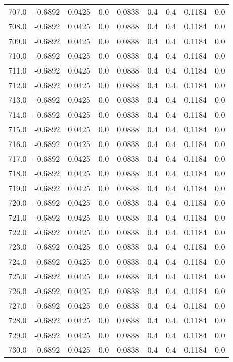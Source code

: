 \begin{longtable}{lrrrrrrrr}
707.0 & -0.6892 & 0.0425 & 0.0 & 0.0838 & 0.4 & 0.4 & 0.1184 & 0.0 \\
708.0 & -0.6892 & 0.0425 & 0.0 & 0.0838 & 0.4 & 0.4 & 0.1184 & 0.0 \\
709.0 & -0.6892 & 0.0425 & 0.0 & 0.0838 & 0.4 & 0.4 & 0.1184 & 0.0 \\
710.0 & -0.6892 & 0.0425 & 0.0 & 0.0838 & 0.4 & 0.4 & 0.1184 & 0.0 \\
711.0 & -0.6892 & 0.0425 & 0.0 & 0.0838 & 0.4 & 0.4 & 0.1184 & 0.0 \\
712.0 & -0.6892 & 0.0425 & 0.0 & 0.0838 & 0.4 & 0.4 & 0.1184 & 0.0 \\
713.0 & -0.6892 & 0.0425 & 0.0 & 0.0838 & 0.4 & 0.4 & 0.1184 & 0.0 \\
714.0 & -0.6892 & 0.0425 & 0.0 & 0.0838 & 0.4 & 0.4 & 0.1184 & 0.0 \\
715.0 & -0.6892 & 0.0425 & 0.0 & 0.0838 & 0.4 & 0.4 & 0.1184 & 0.0 \\
716.0 & -0.6892 & 0.0425 & 0.0 & 0.0838 & 0.4 & 0.4 & 0.1184 & 0.0 \\
717.0 & -0.6892 & 0.0425 & 0.0 & 0.0838 & 0.4 & 0.4 & 0.1184 & 0.0 \\
718.0 & -0.6892 & 0.0425 & 0.0 & 0.0838 & 0.4 & 0.4 & 0.1184 & 0.0 \\
719.0 & -0.6892 & 0.0425 & 0.0 & 0.0838 & 0.4 & 0.4 & 0.1184 & 0.0 \\
720.0 & -0.6892 & 0.0425 & 0.0 & 0.0838 & 0.4 & 0.4 & 0.1184 & 0.0 \\
721.0 & -0.6892 & 0.0425 & 0.0 & 0.0838 & 0.4 & 0.4 & 0.1184 & 0.0 \\
722.0 & -0.6892 & 0.0425 & 0.0 & 0.0838 & 0.4 & 0.4 & 0.1184 & 0.0 \\
723.0 & -0.6892 & 0.0425 & 0.0 & 0.0838 & 0.4 & 0.4 & 0.1184 & 0.0 \\
724.0 & -0.6892 & 0.0425 & 0.0 & 0.0838 & 0.4 & 0.4 & 0.1184 & 0.0 \\
725.0 & -0.6892 & 0.0425 & 0.0 & 0.0838 & 0.4 & 0.4 & 0.1184 & 0.0 \\
726.0 & -0.6892 & 0.0425 & 0.0 & 0.0838 & 0.4 & 0.4 & 0.1184 & 0.0 \\
727.0 & -0.6892 & 0.0425 & 0.0 & 0.0838 & 0.4 & 0.4 & 0.1184 & 0.0 \\
728.0 & -0.6892 & 0.0425 & 0.0 & 0.0838 & 0.4 & 0.4 & 0.1184 & 0.0 \\
729.0 & -0.6892 & 0.0425 & 0.0 & 0.0838 & 0.4 & 0.4 & 0.1184 & 0.0 \\
730.0 & -0.6892 & 0.0425 & 0.0 & 0.0838 & 0.4 & 0.4 & 0.1184 & 0.0 \\

\end{longtable}
